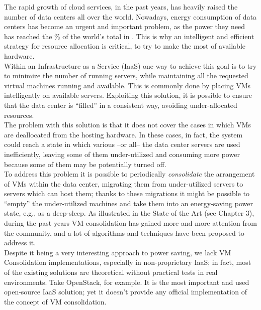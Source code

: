 

The rapid growth of cloud services, in the past years, has heavily raised the number of data centers all over the world. Nowadays, energy consumption of data centers has become an urgent and important problem, as the power they need has reached the \% of the world’s total in . This is why an intelligent and efficient strategy for resource allocation is critical, to try to make the most of available hardware.\\
Within an Infrastructure as a Service (IaaS) one way to achieve this goal is to try to minimize the number of running servers, while maintaining all the requested virtual machines running and available. This is commonly done by placing VMs intelligently on available servers. Exploiting this solution, it is possible to ensure that the data center is ``filled'' in a consistent way, avoiding under-allocated resources.\\
The problem with this solution is that it does not cover the cases in which VMs are deallocated from the hosting hardware. In these cases, in fact, the system could reach a state in which various --or all-- the data center servers are used inefficiently, leaving some of them under-utilized and consuming more power because some of them may be potentially turned off.\\
To address this problem it is possible to periodically \textit{consolidate} the arrangement of VMs within the data center, migrating them from under-utilized servers to servers which can host them; thanks to these migrations it might be possible to ``empty'' the under-utilized machines and take them into an energy-saving power state, e.g., as a deep-sleep. As illustrated in the State of the Art (see Chapter 3), during the past years VM consolidation has gained more and more attention from the community, and a lot of algorithms and techniques have been proposed to address it.\\
Despite it being a very interesting approach to power saving, we lack VM Consolidation implementations, especially in non-proprietary IaaS; in fact, most of the existing solutions are theoretical without practical tests in real environments. Take OpenStack, for example. It is the most important and used open-source IaaS solution; yet it doesn’t provide any official implementation of the concept of VM consolidation.\\
